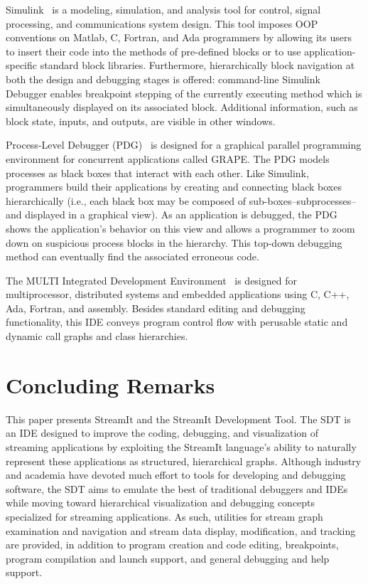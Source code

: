 \documentclass[11pt, letterpaper, onecolumn]{article}
\begin{document}
Simulink~\cite{1}  is a  modeling, simulation,  and analysis  tool for
control,  signal processing,  and communications  system  design. This
tool  imposes   OOP  conventions  on  Matlab,  C,   Fortran,  and  Ada
programmers  by allowing  its  users  to insert  their  code into  the
methods of pre-defined blocks  or to use application-specific standard
block libraries. Furthermore,  hierarchically block navigation at both
the  design and  debugging  stages is  offered: command-line  Simulink
Debugger enables breakpoint stepping of the currently executing method
which is simultaneously displayed on its associated block.  Additional
information, such as block state,  inputs, and outputs, are visible in
other windows.

Process-Level  Debugger  (PDG)~\cite{8} is  designed  for a  graphical
parallel  programming environment  for concurrent  applications called
GRAPE. The PDG models processes as black boxes that interact with each
other. Like Simulink, programmers build their applications by creating
and connecting black boxes hierarchically (i.e., each black box may be
composed  of  sub-boxes--subprocesses--and  displayed in  a  graphical
view). As an application is  debugged, the PDG shows the application's
behavior  on  this  view and  allows  a  programmer  to zoom  down  on
suspicious process  blocks in the hierarchy.   This top-down debugging
method can eventually  find the associated erroneous code.

The MULTI Integrated Development Environment~\cite{12} is designed for
multiprocessor, distributed systems and embedded applications using C,
C++,  Ada,  Fortran,  and   assembly.  Besides  standard  editing  and
debugging functionality,  this IDE  conveys program control  flow with
perusable  static and dynamic  call graphs  and class  hierarchies.


\section{Concluding Remarks}

This paper  presents StreamIt and  the StreamIt Development  Tool. The
SDT  is  an  IDE  designed  to  improve  the  coding,  debugging,  and
visualization  of streaming  applications by  exploiting  the StreamIt
language's  ability  to  naturally  represent  these  applications  as
structured, hierarchical graphs.   Although industry and academia have
devoted much  effort to tools  for developing and  debugging software,
the SDT  aims to  emulate the best  of traditional debuggers  and IDEs
while moving toward  hierarchical visualization and debugging concepts
specialized for streaming applications.  As such, utilities for stream
graph   examination   and   navigation   and  stream   data   display,
modification,  and  tracking  are  provided, in  addition  to  program
creation and code editing, breakpoints, program compilation and launch
support, and general debugging and help support.
\end{document}
